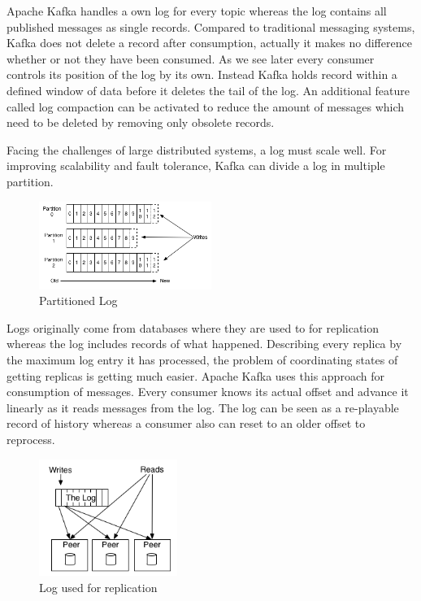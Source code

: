 Apache Kafka handles a own log for every topic whereas the log contains all
published messages as single records. Compared to traditional messaging systems,
Kafka does not delete a record after consumption, actually it makes no difference
 whether or not they have been consumed. As we see later every consumer
controls its position of the log by its own. Instead Kafka holds record within a
defined window of data before it deletes the tail of the log. An additional
feature called log compaction can be activated to reduce the amount of messages
which need to be deleted by removing only obsolete records. \cite{apachekafka} \cite{JK-TheLog}

Facing the challenges of large distributed systems, a log must scale well. For
improving scalability and fault tolerance, Kafka can divide a log in multiple
partition. 

\begin{figure}[H]
    \centering
    \includegraphics[width=0.5\textwidth]{images/log_anatomy.png}
    \caption{Partitioned Log \cite{apachekafka}}
    \label{fig:the-log}
\end{figure}

Logs originally come from databases where they are used to for replication
whereas the log includes records of what happened. Describing every replica by
the maximum log entry it has processed, the problem of coordinating
states of getting replicas is getting much easier. Apache Kafka uses this
approach for consumption of messages. Every consumer knows its actual offset and
advance it linearly as it reads messages from the log. The log can be seen as a
re-playable record of history whereas a consumer also can reset to an older
offset to reprocess. \cite{JK-TheLog}

\begin{figure}[H]
    \centering
    \includegraphics[width=0.4\textwidth]{images/state-machine-replication.png}
    \caption{Log used for replication \cite{JK-TheLog}}
    \label{fig:the-log}
\end{figure}


